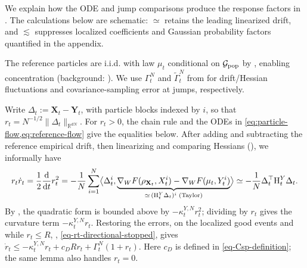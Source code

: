 We explain how the ODE and jump comparisons produce the response factors
in . The calculations below are schematic:
\(\simeq\) retains the leading linearized drift, and \(\lesssim\) suppresses
localized coefficients and Gaussian probability factors quantified in the appendix.

The reference particles are i.i.d. with law \(\mu_t\) conditional on
\(\mathcal G_{\rm pop}\) by
,
enabling concentration (background: \citet{sznitman1991,fournier2015rate}).
We use \(\Gamma_t^N\) and \(\widetilde\Gamma_t^N\) from
 for drift/Hessian fluctuations
and covariance-sampling error at jumps, respectively.

Write \(\Delta_t:=\mathbf X_t-\mathbf Y_t\), with particle blocks indexed by \(i\),
so that \(r_t=N^{-1/2}\|\Delta_t\|_{\mathbb R^{dN}}\).
For \(r_t>0\), the chain rule and the ODEs in
\cref{eq:particle-flow,eq:reference-flow} give the equalities below. After adding and subtracting the reference empirical drift,
then linearizing and comparing Hessians
(), we informally have
\[
 r_t\dot r_t=\frac12\frac{\mathrm d}{\mathrm dt}r_t^2
 =-\frac1N\sum_{i=1}^N\bigl\langle\Delta_t^i,
 \underbrace{\nabla_WF(\rho_{\mathbf X_t},X_t^i)-\nabla_WF(\mu_t,Y_t^i)}_{
 \simeq\,(\mathrm{H}_t^Y\Delta_t)^i\;\text{(Taylor)}}\bigr\rangle
 \simeq-\frac1N\Delta_t^\top\mathrm{H}_t^Y\Delta_t.
\]
By , the quadratic form is bounded above by
\(-\kappa_t^{Y,N}r_t^2\); dividing by \(r_t\) gives the curvature term
\(-\kappa_t^{Y,N}r_t\).
Restoring the errors, on the localized good events and while \(r_t\le R\),
,
\eqref{eq-rt-directional-stopped}, gives
\(\dot r_t\le-\kappa_t^{Y,N}r_t+c_DRr_t+\Gamma_t^N(1+r_t)\).
Here \(c_D\) is defined in \eqref{eq-Csp-definition}; the same lemma
also handles \(r_t=0\).

